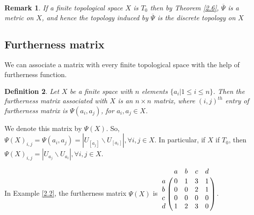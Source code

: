 \documentclass[12pt]{amsart}
\newtheorem{definition}{Definition}[section]
\newtheorem{remark}[definition]{Remark}
\begin{document}
	
	
	
	\begin{remark}{\normalfont
	If a finite topological space $X$ is $T_0$ then by Theorem  \ref{2.6}, $\overline{\Psi}$ is a metric on $X$, and hence the topology induced by $\overline{\Psi}$ is the discrete topology on $X$\par 
	
}
\end{remark}


\subsection{\textbf{Furtherness matrix}} 


We can associate a matrix with every finite topological space with the help of furtherness function.

\begin{definition}
Let $X$ be a finite space with $n$ elements $\{a_i|1\leq i\leq n\}$. Then the furtherness matrix associated with  $X$ is an $n\times n$ matrix, where $(i,j)^{th}$ entry of furtherness matrix is $\Psi(a_i,a_j)$, for $a_i,a_j\in X$.

\end{definition}

We denote this matrix by $\Psi(X)$. So, $\Psi(X)_{i,j}=\Psi(a_i,a_j)=|U_{[a_{j}]}\backslash U_{[a_{i}]}|, \forall i,j\in X$. In particular, if $X$ if $T_0$, then $\Psi(X)_{i,j}=|U_{a_{j}}\backslash U_{a_{i}}|, \forall i,j\in X$. \par 


In Example \ref{2.2}, the furtherness matrix  $\Psi(X)$ is 
$\bordermatrix{ & a & b & c & d \cr
a &	0 & 1 & 3 & 1\cr
b & 0 & 0 & 2 & 1\cr
c &	0 & 0 & 0 & 0\cr
d &	1 & 2 & 3 & 0 }$.\\
 
\end{document}
